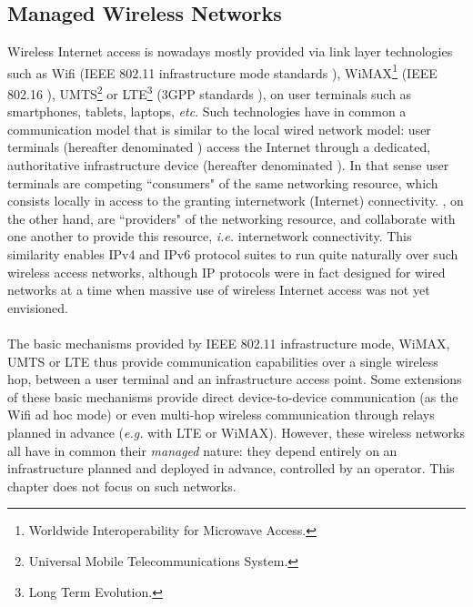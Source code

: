 \subsection{Managed Wireless Networks}
%
Wireless Internet access is nowadays mostly provided via link layer technologies such as Wifi (IEEE 802.11 infrastructure mode standards \cite{IEEE-802-11}), WiMAX\footnote{Worldwide Interoperability for Microwave Access.} (IEEE 802.16 \cite{IEEE-802-16}), UMTS\footnote{Universal Mobile Telecommunications System.} or LTE\footnote{Long Term Evolution.} (3GPP standards \cite{3GPP}), on user terminals such as smartphones, tablets, laptops, {\em etc}. Such technologies have in common a communication model that is similar to the local wired network model: user terminals (hereafter denominated ) access the Internet through a dedicated, authoritative infrastructure device (hereafter denominated ). In that sense user terminals are competing ``consumers" of the same networking resource, which consists locally in access to the  granting internetwork (Internet) connectivity. , on the other hand, are ``providers" of the networking resource, and collaborate with one another to provide this resource, \emph{i.e.} internetwork connectivity. This similarity enables IPv4 and IPv6 protocol suites to run quite naturally over such wireless access networks, although IP protocols were in fact designed for wired networks at a time when massive use of wireless Internet access was not yet envisioned. \ \\ \ \\
%
The basic mechanisms provided by IEEE 802.11 infrastructure mode, WiMAX, UMTS or LTE thus provide communication capabilities over a single wireless hop, between a user terminal and an infrastructure access point. 
Some extensions of these basic mechanisms provide direct device-to-device communication (as the Wifi ad hoc mode) or even multi-hop wireless communication through relays planned in advance ({\em e.g.} with LTE or WiMAX). However, these wireless networks all have in common their \emph{managed} nature: they depend entirely on an infrastructure planned and deployed in advance, controlled by an operator. This chapter does not focus on such networks.

